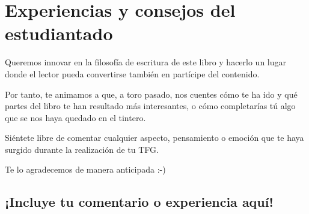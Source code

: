 \chapter{Experiencias y consejos del estudiantado}
\label{anexo:Experiencias}

Queremos innovar en la filosofía de escritura de este libro y hacerlo un lugar donde el lector pueda convertirse también en partícipe del contenido.

Por tanto, te animamos a que, a toro pasado, nos cuentes cómo te ha ido y qué partes del libro te han resultado más interesantes, o cómo completarías tú algo que se nos haya quedado en el tintero.

Siéntete libre de comentar cualquier aspecto, pensamiento o emoción que te haya surgido durante la realización de tu TFG. 

Te lo agradecemos de manera anticipada :-)

\section{¡Incluye tu comentario o experiencia aquí!}
